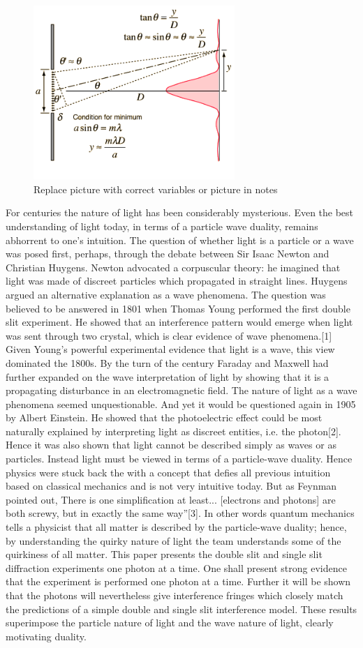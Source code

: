 \documentclass[12pt,twocolumn]{article}
\begin{document}
\begin{figure}[h!]
	\centering
	\label{fig:eq}
	\includegraphics[width=3in]{images/sinslit.png}
	\caption{Replace picture with correct variables or picture in notes}
\end{figure}
For centuries the nature of light has been considerably mysterious. Even the best understanding of light today, in terms of a particle wave duality, remains abhorrent to one’s intuition. The question of whether light is a particle or a wave was posed first, perhaps, through the debate between Sir Isaac Newton and Christian Huygens. Newton advocated a corpuscular theory: he imagined that light was made of discreet particles which propagated in straight lines. Huygens argued an alternative explanation as a wave phenomena. The question was believed to be answered in 1801 when Thomas Young performed the first double slit experiment. He showed that an interference pattern would emerge when light was sent through two crystal, which is clear evidence of wave phenomena.[1] Given Young’s powerful experimental evidence that light is a wave, this view dominated the 1800s. By the turn of the century Faraday and Maxwell had further expanded on the wave interpretation of light by showing that it is a propagating disturbance in an electromagnetic field. The nature of light as a wave phenomena seemed unquestionable. And yet it would be questioned again in 1905 by Albert Einstein. He showed that the photoelectric effect could be most naturally explained by interpreting light as discreet entities, i.e. the photon[2]. Hence it was also shown that light cannot be described simply as waves or as particles. Instead light must be viewed in terms of a particle-wave duality. Hence physics were stuck back the with a concept that defies all previous intuition based on classical mechanics and is not very intuitive today. But as Feynman pointed out, There is one simplification at least... [electrons and photons] are both screwy, but in exactly the same way”[3]. In other words quantum mechanics tells a physicist that all matter is described by the particle-wave duality; hence, by understanding the quirky nature of light the team understands some of the quirkiness of all matter. This paper presents the double slit and single slit diffraction experiments one photon at a time. One shall present strong evidence that the experiment is performed one photon at a time. Further it will be shown that the photons will nevertheless give interference fringes which closely match the predictions of a simple double and single slit interference model. These results superimpose the particle nature of light and the wave nature of light, clearly motivating duality.
\end{document}
